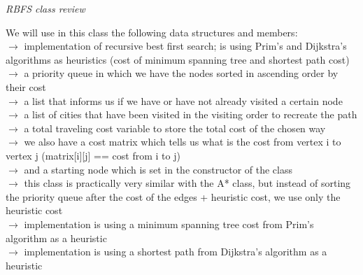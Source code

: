 \documentclass[12pt, a4paper]{article}
\begin{document}
\centering
\large
\textit{RBFS class review}

\vspace{10mm}
\centering
\large

\begin{flushleft}
\hspace{5mm}
We will use in this class the following data structures and members: \\
\vspace{10mm}
\hspace{3mm}$\rightarrow$ implementation of recursive best first search; is using Prim's and Dijkstra's algorithms as heuristics (cost of minimum spanning tree and shortest path cost)\\
\hspace{3mm}$\rightarrow$ a priority queue in which we have the nodes sorted in ascending order by their cost\\
\hspace{3mm}$\rightarrow$ a list that informs us if we have or have not already visited a certain node\\
\hspace{3mm}$\rightarrow$ a list of cities that have been visited in the visiting order to recreate the path\\
\hspace{3mm}$\rightarrow$ a total traveling cost variable to store the total cost of the chosen way\\
\hspace{3mm}$\rightarrow$ we also have a cost matrix which tells us what is the cost from vertex i to vertex j (matrix[i][j] == cost from i to j)\\
\hspace{3mm}$\rightarrow$ and a starting node which is set in the constructor of the class\\
\hspace{3mm}$\rightarrow$ this class is practically very similar with the A* class, but instead of sorting the priority queue after the cost of the edges + heuristic cost, we use only the heuristic cost\\
\hspace{3mm}$\rightarrow$ implementation is using a minimum spanning tree cost from Prim's algorithm as a heuristic\\
\hspace{3mm}$\rightarrow$ implementation is using a shortest path from Dijkstra's algorithm as a heuristic\\
\end{flushleft}
\end{document}
